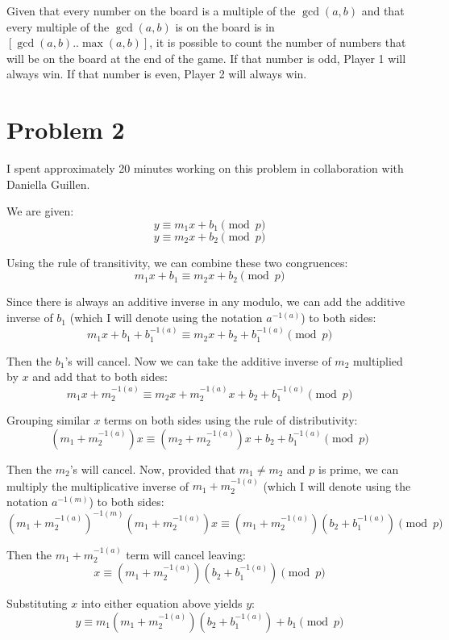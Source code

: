 \documentclass{article}
\begin{document}
Given that every number on the board is a multiple of the $\gcd(a, b)$ and that
every multiple of the $\gcd(a,b)$ is on the board is in $[\gcd(a,b) ..
\max(a,b)]$, it is possible to count the number of numbers that will be on the
board at the end of the game. If that number is odd, Player 1 will always win.
If that number is even, Player 2 will always win.

\break

\section*{Problem 2}

I spent approximately 20 minutes working on this problem in collaboration with
Daniella Guillen.

\bigbreak

We are given:
$$ y \equiv m_1 x + b_1 \pmod{p} $$
$$ y \equiv m_2 x + b_2 \pmod{p} $$

Using the rule of transitivity, we can combine these two congruences:
$$ m_1 x + b_1 \equiv m_2 x + b_2 \pmod{p} $$

Since there is always an additive inverse in any modulo, we can add the additive
inverse of $b_1$ (which I will denote using the notation $a^{-1(a)}$) to both
sides:
$$ m_1 x + b_1 + b_1^{-1(a)} \equiv m_2 x + b_2 + b_1^{-1(a)} \pmod{p} $$

Then the $b_1$'s will cancel. Now we can take the additive inverse of $m_2$
multiplied by $x$ and add that to both sides:
$$ m_1 x + m_2^{-1(a)} \equiv m_2 x + m_2^{-1(a)} x + b_2 + b_1^{-1(a)} \pmod{p}
$$

Grouping similar $x$ terms on both sides using the rule of distributivity:
$$ \left(m_1 + m_2^{-1(a)}\right) x \equiv \left(m_2 + m_2^{-1(a)}\right) x +
b_2 + b_1^{-1(a)} \pmod{p} $$

Then the $m_2$'s will cancel. Now, provided that $m_1 \neq m_2$ and $p$ is
prime, we can multiply the multiplicative inverse of $m_1 + m_2^{-1(a)}$ (which
I will denote using the notation $a^{-1(m)}$) to both sides:
$$ \left(m_1 + m_2^{-1(a)}\right)^{-1(m)} \left(m_1 + m_2^{-1(a)}\right) x
\equiv \left(m_1 + m_2^{-1(a)}\right) \left(b_2 + b_1^{-1(a)}\right) \pmod{p} $$

Then the $m_1 + m_2^{-1(a)}$ term will cancel leaving:
$$ x \equiv \left(m_1 + m_2^{-1(a)}\right) \left(b_2 + b_1^{-1(a)}\right)
\pmod{p} $$

Substituting $x$ into either equation above yields $y$:
$$ y \equiv m_1 \left(m_1 + m_2^{-1(a)}\right) \left(b_2 + b_1^{-1(a)}\right) +
b_1 \pmod{p} $$
\end{document}
